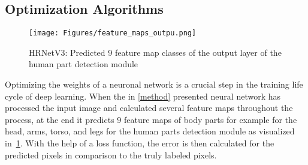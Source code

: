 \subsection{Optimization Algorithms}
\label{opt}
\begin{figure}[H]
    \centering
    \texttt{[image: Figures/feature\_maps\_outpu.png]}
    \decoRule
    \caption[HRNetV3: Prediceted Feature Maps]{HRNetV3: Predicted 9 feature map classes of the output layer of the
    human part detection module}
    \label{fig:feature-maps-output}
\end{figure}
Optimizing the weights of a neuronal network is a crucial step in the training life cycle of deep learning.
When the in \autoref{method} presented neural network has processed the input image and calculated several feature maps throughout the process,
at the end it predicts 9 feature maps of body parts for example for the head, arms, torso, and legs for the human parts
detection module as visualized in~\ref{fig:feature-maps-output}.
With the help of a loss function, the error is then calculated for the predicted pixels in comparison to the truly labeled
pixels.
